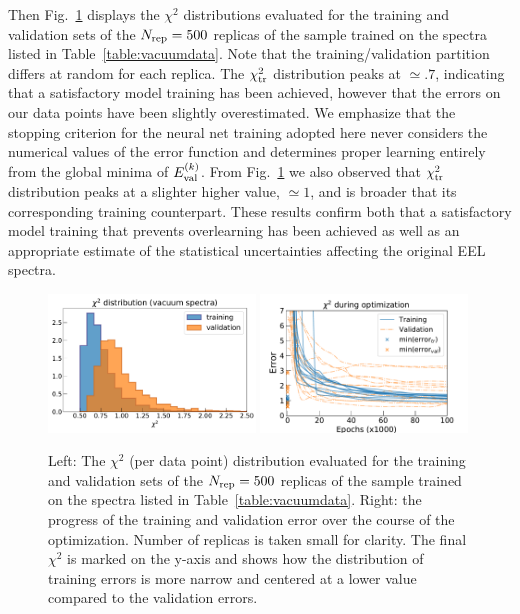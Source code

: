     Then Fig.~\ref{fig:chi2_distributions} displays  the $\chi^2$  distributions
    evaluated for the training and validation sets
      of the $N_{\rm rep}=500$ replicas of the sample trained on the spectra
      listed in Table~\ref{table:vacuumdata}.
      Note that the training/validation partition differs at random for each replica.
      The $\chi^2_{\rm tr}$ distribution peaks at $\simeq .7$, indicating that a satisfactory model training
      has been achieved, however that the errors on our data points have been slightly overestimated.
      We emphasize that the stopping criterion for the neural net training adopted here never considers
      the numerical values of the error function and determines proper learning entirely from
      the global minima of $E_{\rm val}^{(k)}$.
      From Fig.~\ref{fig:chi2_distributions} we also observed that  $\chi^2_{\rm tr}$ distribution peaks at
      a slighter higher value, $\simeq 1$, and is broader that its corresponding training counterpart.
      These results confirm both that a satisfactory model training that prevents overlearning
      has been achieved as well as an appropriate estimate of the statistical uncertainties
      affecting the original EEL spectra.
    
\begin{figure}[H]
    \centering
    \includegraphics[width=0.49\textwidth]{plots/chi2_distributions.pdf}
    \includegraphics[width=0.49\textwidth]{plots/train_val_error_271.pdf}
    \caption{Left: The $\chi^2$ (per data point) distribution evaluated for the training and validation sets
      of the $N_{\rm rep}=500$ replicas of the sample trained on the spectra
      listed in Table~\ref{table:vacuumdata}. Right: the progress of the training and validation error over
      the course of the optimization. Number of replicas is taken small for clarity.
      The final $\chi^2$ is marked on the y-axis and shows how the distribution of training errors
      is more narrow and centered at a lower value compared to the validation errors. }
    \label{fig:chi2_distributions}
\end{figure}

